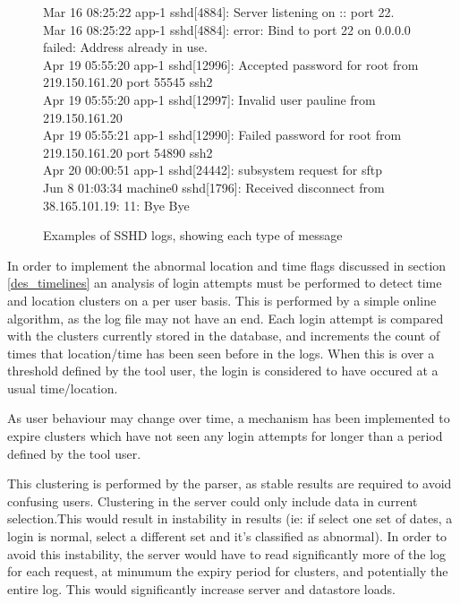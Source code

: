 \begin{figure}[tbh]
\parbox{.99\textwidth}{
{\small Mar 16 08:25:22 app-1 sshd[4884]: Server listening on :: port 22. \\
Mar 16 08:25:22 app-1 sshd[4884]: error: Bind to port 22 on 0.0.0.0 failed: Address already in use. \\
Apr 19 05:55:20 app-1 sshd[12996]: Accepted password for root from 219.150.161.20 port 55545 ssh2 \\
Apr 19 05:55:20 app-1 sshd[12997]: Invalid user pauline from 219.150.161.20 \\
Apr 19 05:55:21 app-1 sshd[12990]: Failed password for root from 219.150.161.20 port 54890 ssh2 \\
Apr 20 00:00:51 app-1 sshd[24442]: subsystem request for sftp \\
Jun 8 01:03:34 machine0 sshd[1796]: Received disconnect from 38.165.101.19: 11: Bye Bye \\}}
\caption{Examples of SSHD logs, showing each type of message}
\label{log_examples}
\end{figure}

In order to implement the abnormal location and time flags discussed in section \ref{des_timelines} an analysis of login attempts must be performed to detect time and location clusters on a per user basis. This is performed by a simple online algorithm, as the log file may not have an end. Each login attempt is compared with the clusters currently stored in the database, and increments the count of times that location/time has been seen before in the logs. When this is over a threshold defined by the tool user, the login is considered to have occured at a usual time/location.

As user behaviour may change over time, a mechanism has been implemented to expire clusters which have not seen any login attempts for longer than a period defined by the tool user. 

This clustering is performed by the parser, as stable results are required to avoid confusing users. Clustering in the server could only include data in current selection.This would result in instability in results (ie: if select one set of dates, a login is normal, select a different set and it's classified as abnormal). In order to avoid this instability, the server would have to read significantly more of the log for each request, at minumum the expiry period for clusters, and potentially the entire log. This would significantly increase server and datastore loads.

